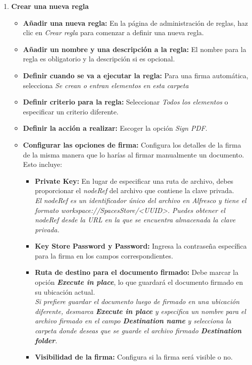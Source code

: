 \documentclass{template/ol-softwaremanual}
\begin{document}
\begin{enumerate}
	\item \textbf{Crear una nueva regla}
	\begin{itemize}
		\item \textbf{Añadir una nueva regla:} En la página de administración de reglas, haz clic en \textit{Crear regla} para comenzar a definir una nueva regla.
		\item \textbf{Añadir un nombre y una descripción a la regla:}  El nombre para la regla es obligatorio y la descripción si es opcional.
		\item \textbf{Definir cuando se va a ejecutar la regla:} Para una firma automática, selecciona \textit{Se crean o entran elementos en esta carpeta}
		\item \textbf{Definir criterio para la regla:} Seleccionar \textit{Todos los elementos} o especificar un criterio diferente.
		\item \textbf{Definir la acción a realizar:} Escoger la opción \textit{Sign PDF}.
		\item \textbf{Configurar las opciones de firma:} Configura los detalles de la firma de la misma manera que lo harías al firmar manualmente un documento. Esto incluye:
		\begin{itemize}
			\item \textbf{Private Key:} En lugar de especificar una ruta de archivo, debes proporcionar el \textit{nodeRef} del archivo que contiene la clave privada. \\ 
			{\small \textit{El nodeRef es un identificador único del archivo en Alfresco y tiene el formato workspace://SpacesStore/<UUID>. Puedes obtener el nodeRef desde la URL en la que se encuentra almacenada la clave privada.}}
			\item \textbf{Key Store Password y Password:} Ingresa la contraseña específica para la firma en los campos correspondientes.
			\item \textbf{Ruta de destino para el documento firmado:} Debe marcar la opción \textit{\textbf{Execute in place}}, lo que guardará el documento firmado en su ubicación actual. \\
			{\small \textit{Si prefiere guardar el documento luego de firmado en una ubicación diferente, desmarca \textit{\textbf{Execute in place}} y especifica un nombre para el archivo firmado en el campo \textbf{Destination name} y selecciona la carpeta donde deseas que se guarde el archivo firmado \textbf{Destination folder}.}}
			\item \textbf{Visibilidad de la firma:} Configura si la firma será visible o no.

\end{itemize}
\end{itemize}
\end{enumerate}
\end{document}
